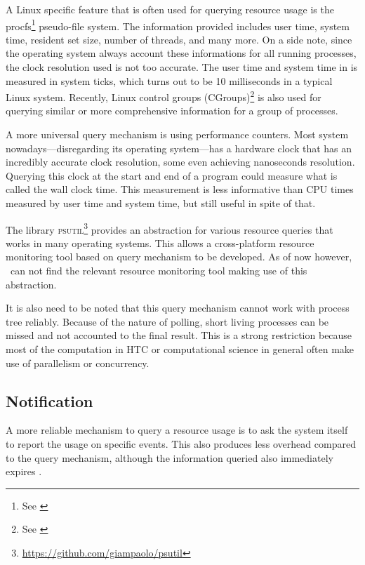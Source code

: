 A Linux specific feature that is often used for querying resource usage is the procfs\footnote{See \href{https://linux.die.net/man/5/proc}{}} pseudo-file system.
The information provided includes user time, system time, resident set size, number of threads, and many more.
On a side note, since the operating system always account these informations for all running processes, the clock resolution used is not too accurate.
The user time and system time in  is measured in system ticks, which turns out to be 10 milliseconds in a typical Linux system.
Recently, Linux control groups (CGroups)\footnote{See \href{http://man7.org/linux/man-pages/man7/cgroups.7.html}{}} is also used for querying similar or more comprehensive information for a group of processes.

A more universal query mechanism is using performance counters.
Most system nowadays---disregarding its operating system---has a hardware clock that has an incredibly accurate clock resolution, some even achieving nanoseconds resolution.
Querying this clock at the start and end of a program could measure what is called the wall clock time.
This measurement is less informative than CPU times measured by user time and system time, but still useful in spite of that.

The library \textsc{psutil}\footnote{\href{https://github.com/giampaolo/psutil}{https://github.com/giampaolo/psutil}} provides an abstraction for various resource queries that works in many operating systems.
This allows a cross-platform resource monitoring tool based on query mechanism to be developed.
As of now however, \first~can not find the relevant resource monitoring tool making use of this abstraction.

It is also need to be noted that this query mechanism cannot work with process tree reliably.
Because of the nature of polling, short living processes can be missed and not accounted to the final result.
This is a strong restriction because most of the computation in HTC or computational science in general often make use of parallelism or concurrency.


\subsection{Notification}

A more reliable mechanism to query a resource usage is to ask the system itself to report the usage on specific events.
This also produces less overhead compared to the query mechanism, although the information queried also immediately expires \citep{juvePracticalResourceMonitoring2015}.

